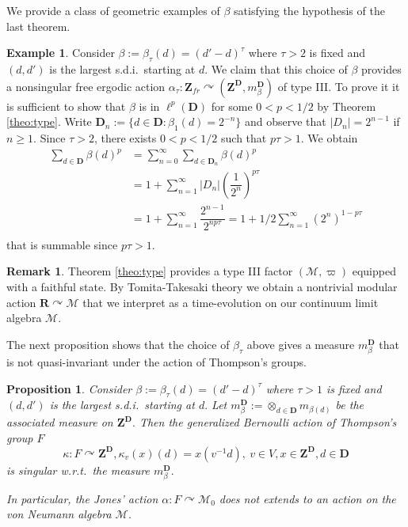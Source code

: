\documentclass[a4paper,12pt]{amsart}
\numberwithin{equation}{section}
\newtheorem{prop}[theo]{Proposition}
\theoremstyle{definition}
\newtheorem{remark}[theo]{Remark}
\newtheorem{example}[theo]{Example}
\newcommand{\act}{\curvearrowright}
\newcommand{\D}{\mathbf D}
\newcommand{\scrM}{\mathscr M}
\newcommand{\mbD}{m_\beta^\D}
\newcommand{\ot}{\otimes}\newcommand{\otmin}{\otimes_{\text{min}}}
\newcommand{\R}{\mathbf{R}}
\newcommand{\Z}{\mathbf{Z}}
\begin{document}
We provide a class of geometric examples of $\beta$ satisfying the hypothesis of the last theorem.

\begin{example}\label{ex:beta}
Consider $\beta:=\beta_\tau(d)= (d'-d)^\tau$ where $\tau>2$ is fixed and $(d,d')$ is the largest s.d.i.~starting at $d.$
We claim that this choice of $\beta$ provides a nonsingular free ergodic action $\alpha_\tau:\Z_{fr}\act (\Z^\D,m_\beta^\D)$ of type III.
To prove it it is sufficient to show that $\beta$ is in $\ell^{p}(\D)$ for some $0<p<1/2$ by Theorem \ref{theo:type}.
Write $\D_n:=\{ d\in \D: \beta_{1}(d)=2^{-n}\}$ and observe that $| D_n | = 2^{n-1}$ if $n\geq 1.$
Since $\tau>2$, there exists $0<p<1/2$ such that $p \tau>1.$
We obtain 
\begin{align*}
\sum_{d\in\D} \beta(d)^p & = \sum_{n=0}^\infty \sum_{d\in \D_n} \beta(d)^p \\
& = 1 +  \sum_{n=1}^\infty |D_n| \left(\dfrac{1}{2^n}\right)^{ p \tau}\\
& = 1+ \sum_{n=1}^\infty \dfrac{ 2^{ n-1 } }{ 2^{ n p \tau } } = 1 + 1/2 \sum_{n=1}^\infty (2^n)^{1- p \tau}\\
\end{align*}
that is summable since $p \tau>1$.
\end{example}

\begin{remark}
Theorem \ref{theo:type} provides a type III factor $(\scrM,\varpi)$ equipped with a faithful state.
By Tomita-Takesaki theory we obtain a nontrivial modular action $\R\act \scrM$ that we interpret as a time-evolution on our continuum limit algebra $\scrM$.
\end{remark}

The next proposition shows that the choice of $\beta_\tau$ above gives a measure $\mbD$ that is not quasi-invariant under the action of Thompson's groups.

\begin{prop}\label{prop:SingularF}
Consider $\beta:=\beta_\tau(d)= (d'-d)^\tau$ where $\tau>1$ is fixed and $(d,d')$ is the largest s.d.i.~starting at $d.$
Let $\mbD:=\ot_{d\in\D} m_{\beta(d)}$ be the associated measure on $\Z^\D.$
Then the generalized Bernoulli action of Thompson's group $F$
$$\kappa: F\act \Z^\D, \kappa_v (x)(d) = x(v^{-1} d),\ v\in V, x\in\Z^\D, d\in \D$$
is singular w.r.t.~the measure $\mbD.$

In particular, the Jones' action $\alpha:F\act \scrM_0$ does not extends to an action on the von Neumann algebra $\scrM$.
\end{prop}
\end{document}
